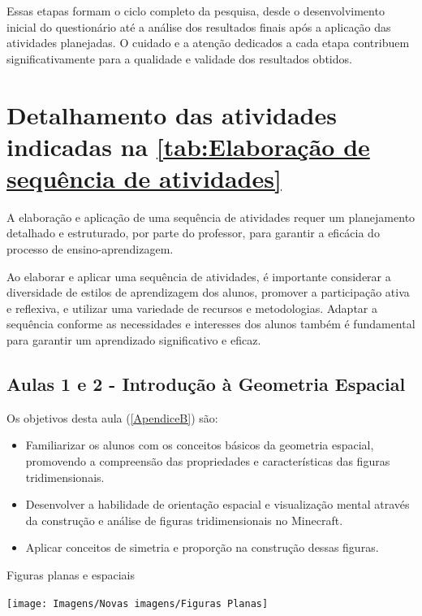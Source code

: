 Essas etapas formam o ciclo completo da pesquisa, desde o desenvolvimento inicial do questionário até a análise dos resultados finais após a aplicação das atividades planejadas. O cuidado e a atenção dedicados a cada etapa contribuem significativamente para a qualidade e validade dos resultados obtidos.

\section{Detalhamento das atividades indicadas na \autoref{tab:Elaboração de sequência de atividades}}

A elaboração e aplicação de uma sequência de atividades requer um planejamento detalhado e estruturado, por parte do professor, para garantir a eficácia do processo de ensino-aprendizagem.

Ao elaborar e aplicar uma sequência de atividades, é importante considerar a diversidade de estilos de aprendizagem dos alunos, promover a participação ativa e reflexiva, e utilizar uma variedade de recursos e metodologias. Adaptar a sequência conforme as necessidades e interesses dos alunos também é fundamental para garantir um aprendizado significativo e eficaz.

\subsection{Aulas 1 e 2 - Introdução à Geometria Espacial}

Os objetivos desta aula (\autoref{ApendiceB}) são:

\begin{itemize}
    \item Familiarizar os alunos com os conceitos básicos da geometria espacial, promovendo a compreensão das propriedades e características das figuras tridimensionais.
    \item Desenvolver a habilidade de orientação espacial e visualização mental através da construção e análise de figuras tridimensionais no Minecraft.
    \item Aplicar conceitos de simetria e proporção na construção dessas figuras.
\end{itemize}

\begin{CenteredFigure}
    \caption{Figuras planas e espaciais} \label{fig:00-Figuras planas e espaciais}
    \texttt{[image: Imagens/Novas imagens/Figuras Planas]}
    \legend{\autoria}
\end{CenteredFigure}


